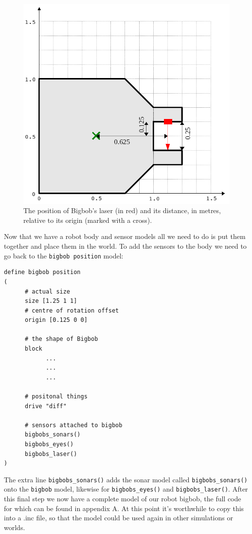 \documentclass[a4paper]{report}
\begin{document}
\begin{figure}
	\centering
	\includegraphics[width=0.6\linewidth]{./pics/robot_building/bigbob_laser.png} 
	\caption{The position of Bigbob's laser (in red) and its distance, in metres, relative to its origin (marked with a cross).}
	\label{fig:laserdrawing}
\end{figure}


Now that we have a robot body and sensor models all we need to do is put them together and place them in the world. To add the sensors to the body we need to go back to the \verb|bigbob position| model:
\begin{verbatim}
define bigbob position
(
      # actual size
      size [1.25 1 1]
      # centre of rotation offset
      origin [0.125 0 0]

      # the shape of Bigbob
      block
            ...
            ...
            ...
      
      # positonal things
      drive "diff"
      
      # sensors attached to bigbob
      bigbobs_sonars()
      bigbobs_eyes()
      bigbobs_laser()
)
\end{verbatim}
The extra line \verb|bigbobs_sonars()| adds the sonar model called \verb|bigbobs_sonars()| onto the \verb|bigbob| model, likewise for \verb|bigbobs_eyes()| and \verb|bigbobs_laser()|. After this final step we now have a complete model of our robot bigbob, the full code for which can be found in appendix A. At this point it's worthwhile to copy this into a .inc file, so that the model could be used again in other simulations or worlds.
\end{document}
